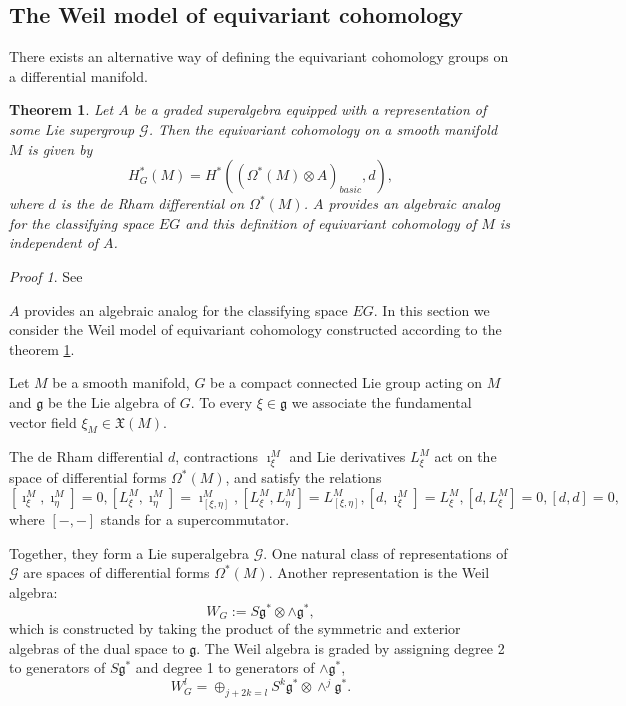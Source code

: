 \documentclass[11pt]{report}
\theoremstyle{plain}
\newtheorem{thm}{Theorem}[section]
\theoremstyle{definition}
\theoremstyle{remark}
\theoremstyle{remark}
\newtheorem*{pr}{Proof}
\numberwithin{equation}{section}
\begin{document}
\subsection{The Weil model of equivariant cohomology}

There exists an alternative way of defining the equivariant cohomology groups on a differential manifold. 

\begin{thm}\label{Weil}
Let $A$ be a graded superalgebra equipped with a representation of some Lie supergroup $\mathcal{G}$. Then the equivariant cohomology on a smooth manifold $M$ is given by
\begin{equation}
H^*_G(M) = H^*\left( (\Omega^*(M)\otimes A)_{basic}, d\right), 
\end{equation}
where $d$ is the de Rham differential on $\Omega^*(M)$. $A$ provides an algebraic analog for the classifying space $EG$ and this definition of equivariant cohomology of $M$ is independent of $A$.
\end{thm}
\begin{pr}
See \cite{Super}
\end{pr}

$A$ provides an algebraic analog for the classifying space $EG$.
In this section we consider the Weil model of equivariant cohomology constructed according to the theorem \ref{Weil}.

Let $M$ be a smooth  manifold, $G$ be a compact connected Lie group acting on $M$ and $\mathfrak{g}$ be the Lie algebra of $G$. 
To every $\xi \in \mathfrak{g}$ we associate the fundamental vector field $\xi_M \in \mathfrak{X}(M)$.


The de Rham differential $d$, contractions $\imath_\xi^M$ and Lie derivatives $L_\xi^M$ act on the space of differential forms $\Omega^*(M)$, and satisfy the relations
%
$$
[\imath_\xi^M, \imath_\eta^M] =0, [L_\xi^M, \imath_\eta^M] = \imath_{[\xi, \eta]}^M, [L_\xi^M, L_\eta^M]=L_{[\xi, \eta]}^M,
[d, \imath_{\xi}^M] =L_{\xi}^M, [d, L_{\xi}^M]=0, [d,d]=0,
$$
where $[-,-]$ stands for a supercommutator.

Together, they form a Lie superalgebra  $\mathcal{G}$.  One natural class of representations of $\mathcal{G}$ are spaces of differential forms $\Omega^*(M)$. Another representation is the Weil algebra:
%
\begin{equation}
W_G:= S{\mathfrak{g}^*} \otimes \wedge {\mathfrak{g}^*},
\end{equation}
which is constructed by taking the product of the symmetric and exterior algebras of the dual space to $\mathfrak{g}$.
The Weil algebra is graded  by assigning degree 2 to generators of $S\mathfrak{g}^*$ and degree 1 to generators of $\wedge \mathfrak{g}^*$,
%
\begin{equation}
W^l_G = \oplus_{j+2k=l} S^k {\mathfrak{g}^*} \otimes \wedge^j \mathfrak{g}^*.
\end{equation}
\end{document}
